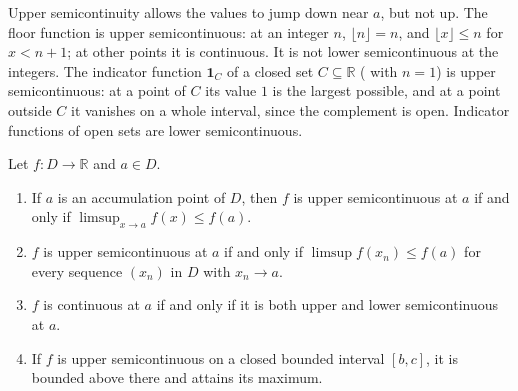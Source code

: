 Upper semicontinuity allows the values to jump down near $a$, but not up. The floor function is upper semicontinuous: at an integer $n$, $\lfloor n\rfloor=n$, and $\lfloor x\rfloor\le n$ for $x<n+1$; at other points it is continuous. It is not lower semicontinuous at the integers. The indicator function $\mathbf 1_C$ of a closed set $C\subseteq\mathbb R$ ( with $n=1$) is upper semicontinuous: at a point of $C$ its value $1$ is the largest possible, and at a point outside $C$ it vanishes on a whole interval, since the complement is open. Indicator functions of open sets are lower semicontinuous.

\begin{proposition}[Semicontinuity]
\label{prop:semicontinuity}
Let $f\colon D\to\mathbb R$ and $a\in D$.
\begin{enumerate}
\item If $a$ is an accumulation point of $D$, then $f$ is upper semicontinuous at $a$ if and only if $\limsup_{x\to a}f(x)\le f(a)$.
\item $f$ is upper semicontinuous at $a$ if and only if $\limsup f(x_n)\le f(a)$ for every sequence $(x_n)$ in $D$ with $x_n\to a$.
\item $f$ is continuous at $a$ if and only if it is both upper and lower semicontinuous at $a$.
\item If $f$ is upper semicontinuous on a closed bounded interval $[b,c]$, it is bounded above there and attains its maximum.
\end{enumerate}
\end{proposition}

